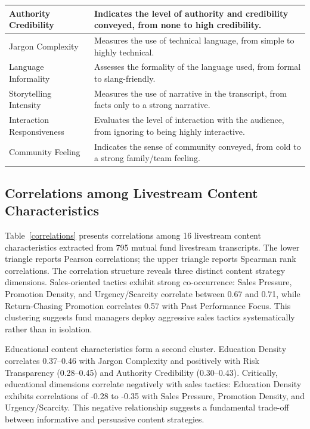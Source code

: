 \begin{longtable}{lp{}}
  \midrule
  Authority Credibility      & Indicates the level of authority and credibility conveyed, from none to high credibility.             \\
  \midrule
  Jargon Complexity          & Measures the use of technical language, from simple to highly technical.                              \\
  \midrule
  Language Informality       & Assesses the formality of the language used, from formal to slang-friendly.                           \\
  \midrule
  Storytelling Intensity     & Measures the use of narrative in the transcript, from facts only to a strong narrative.               \\
  \midrule
  Interaction Responsiveness & Evaluates the level of interaction with the audience, from ignoring to being highly interactive.      \\
  \midrule
  Community Feeling          & Indicates the sense of community conveyed, from cold to a strong family/team feeling.                 \\
  \midrule
\end{longtable}




\subsection{Correlations among Livestream Content Characteristics}\label{subsec:correlations}

Table~\ref{correlations} presents correlations among 16 livestream content characteristics extracted from 795 mutual fund livestream transcripts. The lower triangle reports Pearson correlations; the upper triangle reports Spearman rank correlations.
The correlation structure reveals three distinct content strategy dimensions. Sales-oriented tactics exhibit strong co-occurrence: Sales Pressure, Promotion Density, and Urgency/Scarcity correlate between 0.67 and 0.71, while Return-Chasing Promotion correlates 0.57 with Past Performance Focus. This clustering suggests fund managers deploy aggressive sales tactics systematically rather than in isolation.

Educational content characteristics form a second cluster. Education Density correlates 0.37--0.46 with Jargon Complexity and positively with Risk Transparency (0.28--0.45) and Authority Credibility (0.30--0.43). Critically, educational dimensions correlate negatively with sales tactics: Education Density exhibits correlations of -0.28 to -0.35 with Sales Pressure, Promotion Density, and Urgency/Scarcity. This negative relationship suggests a fundamental trade-off between informative and persuasive content strategies.

